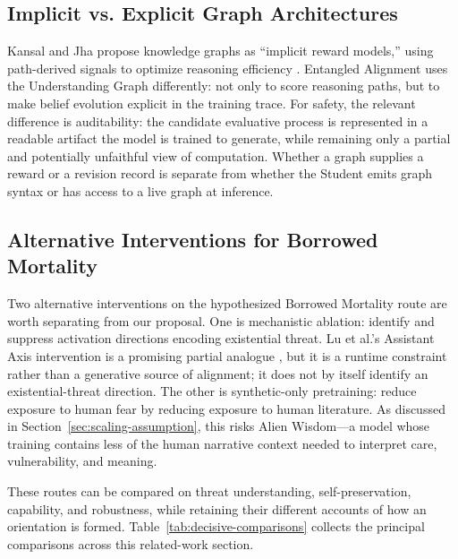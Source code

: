 \subsection{Implicit vs. Explicit Graph Architectures}

Kansal and Jha propose knowledge graphs as ``implicit reward models,'' using
path-derived signals to optimize reasoning efficiency
\cite{kansal2026knowledgegraphsimplicitreward}. Entangled Alignment uses the
Understanding Graph differently: not only to score reasoning paths, but to make
belief evolution explicit in the training trace. For safety, the relevant
difference is auditability: the candidate evaluative process is represented in
a readable artifact the model is trained to generate, while remaining only a
partial and potentially unfaithful view of computation. Whether a graph supplies
a reward or a revision record is separate from whether the Student emits graph
syntax or has access to a live graph at inference.

\subsection{Alternative Interventions for Borrowed Mortality}

	Two alternative interventions on the hypothesized Borrowed Mortality route
are worth separating from our proposal.
	One is mechanistic ablation: identify and suppress activation directions
	encoding existential threat. Lu et al.'s Assistant Axis intervention is a
	promising partial analogue \cite{lu2026assistantaxissituatingstabilizing},
	but it is a runtime constraint rather than a generative source of alignment;
it does not by itself identify an existential-threat direction.
		The other is synthetic-only pretraining: reduce exposure to human fear by
		reducing exposure to human literature. As discussed in
		Section~\ref{sec:scaling-assumption}, this risks Alien Wisdom---a model whose
		training contains less of the human narrative context needed to interpret
		care, vulnerability, and meaning.

These routes can be compared on threat understanding, self-preservation,
capability, and robustness, while retaining their different accounts of how an
orientation is formed. Table~\ref{tab:decisive-comparisons} collects the principal
comparisons across this related-work section.

